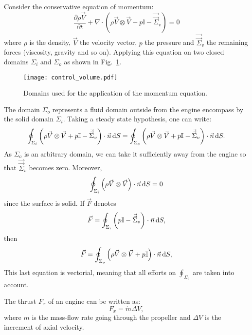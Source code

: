 Consider the conservative equation of momentum:
\begin{equation}
	\frac{\partial \rho \vec{V}}{\partial t} 
	+ \nabla \cdot (\rho \vec{V} \otimes \vec{V} + p \mathbb{I} - \vec{\vec{\Sigma}}_v) = 0
\end{equation}
where $\rho$ is the density, $\vec{V}$ the velocity vector, $p$ the pressure and
$\vec{\vec{\Sigma}}_v$ the remaining forces (viscosity, gravity and so on).
Applying this equation on two closed domains $\Sigma_i$ and $\Sigma_o$ as
shown in Fig.~\ref{fig:cror_control_volume}.
\begin{figure}[htb]
  \centering
  \texttt{[image: control\_volume.pdf]}
  \caption{Domains used for the application of the momentum equation.}
  \label{fig:cror_control_volume}
\end{figure}
The domain $\Sigma_o$ represents a fluid domain outside from the
engine encompass by the solid domain $\Sigma_i$.
Taking a steady state hypothesis, one can write:
\begin{equation}
	\oint_{\Sigma_i} \left(\rho \vec{V} \otimes \vec{V} + 
	                       p \mathbb{I} - 
	                       \vec{\vec{\Sigma}}_v \right) \cdot \vec{n} \mathop{}\!\mathrm{d} S
    =
   	\oint_{\Sigma_o} \left(\rho \vec{V} \otimes \vec{V} + 
	                       p \mathbb{I} - 
	                       \vec{\vec{\Sigma}}_v \right) \cdot \vec{n} \mathop{}\!\mathrm{d} S.
\end{equation} 
As $\Sigma_o$ is an arbitrary domain, we can take it sufficiently
away from the engine so that $\vec{\vec{\Sigma}}_v$ becomes zero.
Moreover, 
\begin{equation}
	\oint_{\Sigma_i} \left(\rho \vec{V} \otimes \vec{V} \right) \cdot \vec{n} \mathop{}\!\mathrm{d} S = 0
\end{equation}
since the surface is solid. If $\vec{F}$ denotes
\begin{equation}
	\vec{F} = \oint_{\Sigma_i} \left(p \mathbb{I} - 
	\vec{\vec{\Sigma}}_v \right) \cdot \vec{n} \mathop{}\!\mathrm{d} S,
\end{equation}
then
\begin{equation}
	\vec{F} = \oint_{\Sigma_o} \left(\rho \vec{V} \otimes \vec{V} +
	p \mathbb{I} \right) \cdot \vec{n} \mathop{}\!\mathrm{d} S,
\end{equation}
This last equation is vectorial, meaning that all efforts on 
$\oint_{\Sigma_i}$ are taken into account.

The thrust $F_x$ of an engine can be written as:
\begin{equation}
	F_x = \dot{m} \Delta V,
\end{equation}
where $m$ is the mass-flow rate going through the
propeller and $\Delta V$ is
the increment of axial velocity.


